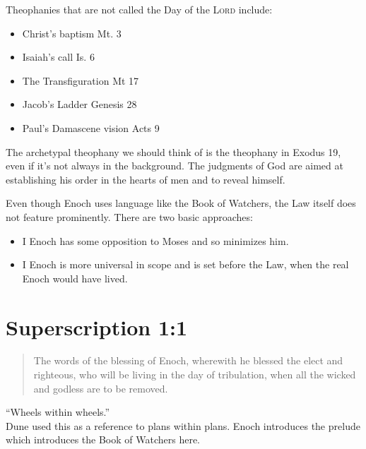 \documentclass{beamer}
\begin{document}
\begin{frame}
  Theophanies that are not called the Day of the \textsc{Lord} include:\pause
  \begin{itemize}
	\item Christ's baptism Mt. 3\pause
	\item Isaiah's call Is. 6\pause
	\item The Transfiguration Mt 17\pause
	\item Jacob's Ladder Genesis 28\pause
	\item Paul's Damascene vision Acts 9
  \end{itemize}
\end{frame}

\begin{frame}
  The archetypal theophany we should think of is the theophany in Exodus 19, even if it's not always in the background.
  The judgments of God are aimed at establishing his order in the hearts of men and to reveal himself.
\end{frame}

\begin{frame}
  Even though Enoch uses language like the Book of Watchers, the Law itself does not feature prominently.
  There are two basic approaches:\pause
  \begin{itemize}
	\item I Enoch has some opposition to Moses and so minimizes him.\pause
	\item I Enoch is more universal in scope and is set before the Law, when the real Enoch would have lived.
  \end{itemize}
\end{frame}

\section{Superscription 1:1}

\begin{frame}
  \begin{quote}
	The words of the blessing of Enoch, wherewith he blessed the elect and righteous, who will be living in the day of tribulation, when all the wicked and godless are to be removed.
  \end{quote}
\end{frame}

\begin{frame}
  ``Wheels within wheels.''\\
  Dune used this as a reference to plans within plans.
  Enoch introduces the prelude which introduces the Book of Watchers here.
\end{frame}
\end{document}
